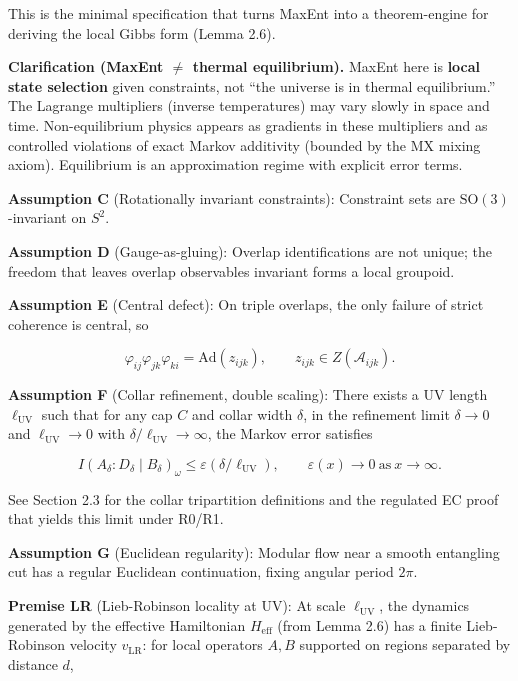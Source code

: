 \documentclass[11pt,a4paper]{article}
\theoremstyle{remark}
\begin{document}
This is the minimal specification that turns MaxEnt into a theorem-engine for
deriving the local Gibbs form (Lemma 2.6).

\textbf{Clarification (MaxEnt \ensuremath{\neq} thermal equilibrium).} MaxEnt here is \textbf{local state
selection} given constraints, not ``the universe is in thermal equilibrium.''
The Lagrange multipliers (inverse temperatures) may vary slowly in space and
time. Non-equilibrium physics appears as gradients in these multipliers and as
controlled violations of exact Markov additivity (bounded by the MX mixing
axiom). Equilibrium is an approximation regime with explicit error terms.

\textbf{Assumption C} (Rotationally invariant constraints): Constraint sets are \(\mathrm{SO}(3)\)-invariant on \(S^2\).

\textbf{Assumption D} (Gauge-as-gluing): Overlap identifications are not unique; the
freedom that leaves overlap observables invariant forms a local groupoid.

\textbf{Assumption E} (Central defect): On triple overlaps, the only failure of strict
coherence is central, so

\[
\varphi_{ij} \varphi_{jk} \varphi_{ki} = \mathrm{Ad}(z_{ijk}),\qquad z_{ijk} \in Z(\mathcal{A}_{ijk}).
\]

\textbf{Assumption F} (Collar refinement, double scaling): There exists a UV length
\(\ell_{\mathrm{UV}}\) such that for any cap \(C\) and collar width \(\delta\), in the refinement limit
\(\delta \to 0\) and \(\ell_{\mathrm{UV}} \to 0\) with \(\delta/\ell_{\mathrm{UV}} \to \infty\), the Markov error
satisfies

\[
I(A_\delta:D_\delta \mid B_\delta)_\omega \le \varepsilon(\delta/\ell_{\mathrm{UV}}),
\qquad \varepsilon(x) \to 0 \ \text{as} \ x \to \infty.
\]

See Section 2.3 for the collar tripartition definitions and the regulated EC
proof that yields this limit under R0/R1.

\textbf{Assumption G} (Euclidean regularity): Modular flow near a smooth entangling cut
has a regular Euclidean continuation, fixing angular period \(2\pi\).

\textbf{Premise LR} (Lieb-Robinson locality at UV): At scale \(\ell_{\mathrm{UV}}\), the
dynamics generated by the effective Hamiltonian \(H_{\mathrm{eff}}\) (from Lemma 2.6)
has a finite Lieb-Robinson velocity \(v_{\mathrm{LR}}\): for local operators \(A, B\)
supported on regions separated by distance \(d\),
\end{document}
